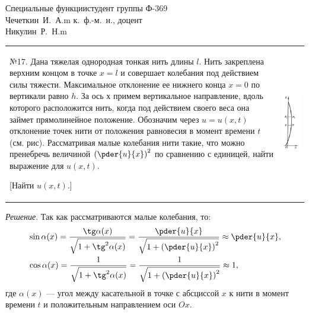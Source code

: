 




{Специальные функции}{}{}{студент группы Ф-369\\Чечеткин~И.~А.}{m}
{к.~ф.-м.~н., доцент\\Никулин~Р.~Н.}{m}

\begin{table}[h!]
    \center
    \begin{tabular}{m{}C{.15}}
    №17. Дана тяжелая однородная тонкая нить длины \( l \). Нить закреплена верхним
    концом в точке \( x = l \) и совершает колебания под действием силы тяжести.
    Максимальное отклонение ее нижнего конца \( x = 0 \) по вертикали равно \( h \).
    За ось \( х \) примем вертикальное направление, вдоль которого расположится
    нить, когда под действием своего веса она займет прямолинейное положение.
    Обозначим через \( u = u(x, t) \) отклонение точек нити от положения равновесия
    в момент времени \( t \) (см. рис). Рассматривая малые колебания нити такие, что
    можно пренебречь величиной \( \left(\pder{u}{x}\right)^2 \) по сравнению с
    единицей, найти выражение для \( u(x, t) \).
    
    [Найти \( u(x, t)\).] &
    \includegraphics[width=.13\textwidth]{scheme}
    \end{tabular}
\end{table}

\vspace*{2em}
\emph{Решение}. Так как рассматриваются малые колебания, то:
\begin{align*}
    & \sin\alpha(x) = \frac{\tg\alpha(x)}{\sqrt{1 + \tg^2\alpha(x)}} =
    \frac{\pder{u}{x}}{\sqrt{1 + \left(\pder{u}{x}\right)^2}} \approx \pder{u}{x}, \\
    & \cos\alpha(x) = \frac{1}{\sqrt{1 + \tg^2\alpha(x)}} =
    \frac{1}{\sqrt{1 + \left(\pder{u}{x}\right)^2}} \approx 1,
\end{align*}
где \( \alpha(x) \) --- угол между касательной в точке с абсциссой \( x \) к нити в момент
времени \( t \) и положительным направлением оси \( Ox \).

